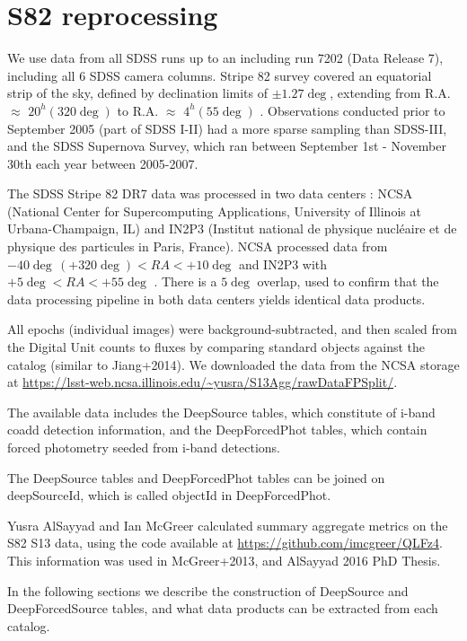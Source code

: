 \documentclass[fleqn,usenatbib]{mnras}  %
\begin{document}
\section{S82 reprocessing}
\label{sec:data}


We use data from all SDSS runs up to an including run 7202 (Data Release 7), including all 6 SDSS camera columns. Stripe 82 survey covered an equatorial strip of the sky, defined by declination limits of $\pm1.27\deg$, extending from R.A. $\approx$ $20^{h} (320 \deg)$ to R.A.  $\approx$ $4^{h} (55 \deg)$ \citep{sesar2007,sesar2010}. Observations conducted prior to September 2005 (part of SDSS I-II) had a more sparse sampling than SDSS-III, and the SDSS Supernova Survey, which ran between September 1st - November 30th each year between 2005-2007. 

The SDSS Stripe 82 DR7  data  was processed in two data centers : NCSA (National Center for Supercomputing Applications, University of Illinois at Urbana-Champaign, IL) and IN2P3  (Institut national de physique nucl\'eaire et de physique des particules in Paris, France). NCSA processed data from $-40 \deg \, (+320 \deg) < RA < +10 \deg $ and IN2P3 with $ +5 \deg < RA < +55 \deg$ . There is a $5 \deg$ overlap, used to confirm that the data processing pipeline in both data centers yields identical data products. 

All epochs (individual images) were background-subtracted, and then scaled from the Digital Unit counts to fluxes by comparing standard objects against the \citep{ivezic2007} catalog  (similar to  Jiang+2014). We downloaded the data from the NCSA storage at \url{https://lsst-web.ncsa.illinois.edu/~yusra/S13Agg/rawDataFPSplit/}.   

The available data includes the DeepSource tables, which constitute of i-band coadd detection information,  and the DeepForcedPhot  tables, which contain forced photometry seeded from i-band detections. 

The DeepSource tables  and DeepForcedPhot tables can be joined on deepSourceId, which is called objectId in DeepForcedPhot. 

Yusra AlSayyad and Ian McGreer calculated summary aggregate metrics on the S82 S13 data, using the code available at \url{https://github.com/imcgreer/QLFz4}. This information was used in McGreer+2013, and AlSayyad 2016 PhD Thesis.  

In the following sections we describe the construction of DeepSource and DeepForcedSource tables, and what data products can be extracted from each catalog. 
\end{document}
